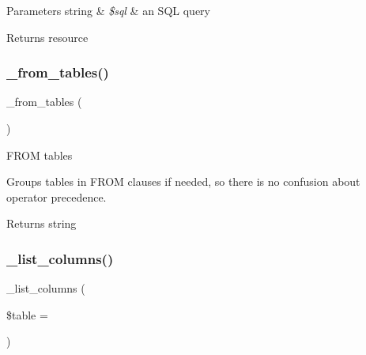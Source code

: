 \begin{DoxyParams}[1]{Parameters}
string & {\em \$sql} & an S\+QL query \\
\hline
\end{DoxyParams}
\begin{DoxyReturn}{Returns}
resource 
\end{DoxyReturn}
\mbox{\label{class_c_i___d_b__cubrid__driver_aef43f7e3e7b71d337ff3724c5eb14f10}} 
\subsubsection{\texorpdfstring{\+\_\+from\+\_\+tables()}{\_from\_tables()}}
{\footnotesize\ttfamily \+\_\+from\+\_\+tables (\begin{DoxyParamCaption}{ }\end{DoxyParamCaption})\hspace{0.3cm}{\ttfamily [protected]}}

F\+R\+OM tables

Groups tables in F\+R\+OM clauses if needed, so there is no confusion about operator precedence.

\begin{DoxyReturn}{Returns}
string 
\end{DoxyReturn}
\mbox{\label{class_c_i___d_b__cubrid__driver_a7ccb7f9c301fe7f0a9db701254142b63}} 
\subsubsection{\texorpdfstring{\+\_\+list\+\_\+columns()}{\_list\_columns()}}
{\footnotesize\ttfamily \+\_\+list\+\_\+columns (\begin{DoxyParamCaption}\item[{}]{\$table = {\ttfamily \textquotesingle{}\textquotesingle{}} }\end{DoxyParamCaption})\hspace{0.3cm}{\ttfamily [protected]}}

